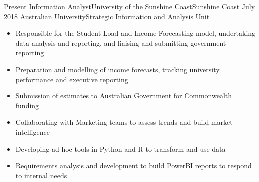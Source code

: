 %
%
%

\begin{experiences}
  \consultantexperience
    {Present}   {Information Analyst}{University of the Sunshine Coast}{Sunshine Coast}
    {July 2018}  {Australian University}{Strategic Information and Analysis Unit}
    {
                      \begin{itemize}
                 \item Responsible for the Student Load and Income Forecasting model, undertaking data analysis and reporting, and liaising and submitting government reporting
		\item Preparation and modelling of income forecasts, tracking university performance and executive reporting
		\item Submission of estimates to Australian Government for Commonwealth funding
		\item Collaborating with Marketing teams to assess trends and build market intelligence 
		\item Developing ad-hoc tools in Python and R to transform and use data
		\item Requirements analysis and development to build PowerBI reports to respond to internal needs
                                                              

\end{itemize}}
\end{experiences}
